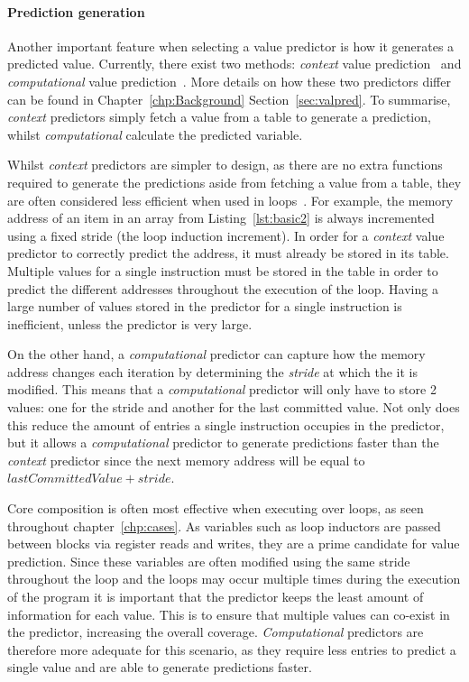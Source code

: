 \paragraph*{Prediction generation} Another important feature when selecting a value predictor is how it generates a predicted value.
Currently, there exist two methods: \textit{context} value prediction~\cite{peraisVTAGE2014} and \textit{computational} value prediction~\cite{peraisBeBop2015,gabbayVPOrig,goeman01dfcm}.
More details on how these two predictors differ can be found in Chapter~\ref{chp:Background} Section~\ref{sec:valpred}.
To summarise, \textit{context} predictors simply fetch a value from a table to generate a prediction, whilst \textit{computational} calculate the predicted variable.

Whilst \textit{context} predictors are simpler to design, as there are no extra functions required to generate the predictions aside from fetching a value from a table, they are often considered less efficient when used in loops~\cite{peraisBeBop2015}.
For example, the memory address of an item in an array from Listing~\ref{lst:basic2} is always incremented using a fixed stride (the loop induction increment).
In order for a \textit{context} value predictor to correctly predict the address, it must already be stored in its table.
Multiple values for a single instruction must be stored in the table in order to predict the different addresses throughout the execution of the loop.
Having a large number of values stored in the predictor for a single instruction is inefficient, unless the predictor is very large.

On the other hand, a \textit{computational} predictor can capture how the memory address changes each iteration by determining the \textit{stride} at which the it is modified.
This means that a \textit{computational} predictor will only have to store 2 values: one for the stride and another for the last committed value.
Not only does this reduce the amount of entries a single instruction occupies in the predictor, but it allows a \textit{computational} predictor to generate predictions faster than the \textit{context} predictor since the next memory address will be equal to $ lastCommittedValue + stride$.

Core composition is often most effective when executing over loops, as seen throughout chapter~\ref{chp:cases}.
As variables such as loop inductors are passed between blocks via register reads and writes, they are a prime candidate for value prediction.
Since these variables are often modified using the same stride throughout the loop and the loops may occur multiple times during the execution of the program it is important that the predictor keeps the least amount of information for each value.
This is to ensure that multiple values can co-exist in the predictor, increasing the overall coverage.
\textit{Computational} predictors are therefore more adequate for this scenario, as they require less entries to predict a single value and are able to generate predictions faster.



